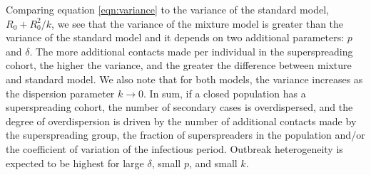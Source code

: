 \documentclass{imammb}
\numberwithin{equation}{section}
\newcommand{\comment}[1]{}
\begin{document}
Comparing equation \eqref{eqn:variance} to the variance of the standard model, $R_0+R_0^2/k$, we see that the variance of the mixture model is greater than the variance of the standard model and it depends on two additional parameters: $p$ and $\delta$. The more additional contacts made per individual in the superspreading cohort, the higher the variance, and the greater the difference between mixture and standard model. We also note that for both models, the variance increases as the dispersion parameter $k\rightarrow 0$. In sum, if a closed population has a superspreading cohort, the number of secondary cases is overdispersed, and the degree of overdispersion is driven by the number of additional contacts made by the superspreading group, the fraction of superspreaders in the population and/or the coefficient of variation of the infectious period. Outbreak heterogeneity is expected to be highest for large $\delta$, small $p$, and small $k$.  %


\comment{
\begin{align*}
P(5 \text{ secondary infections }) &= P( \text{ 5 secondary infections from infectious individual in superspreading cohort}) \\&\text{ or } P( \text{ 5 secondary infections from infectious individual in regular cohort })\\
&=P(\text{choosing regular infectious individ})P(5 \text{ infections conditional on regular infectious individ})\\ &\text{or } P(\text{superspreading})P(5 \text{infections conditional on being from superspreading cohort}), 
\end{align*}
or expressed mathematically as,
\begin{align*}
    P(I=5) &=(1-p) P(I=5|\text{regular}) +p P(I=5|\text{superspreading}) \\
     &=p P(T=5|\mathcal{V}=\beta^R) +(1-p) P(T=5|\mathcal{V}=\beta^A)\\
     &=p \frac{(\beta^R)^5}{5!} e^{-\beta^R} +(1-p)\frac{(\beta^A)^5}{5!} e^{-\beta^A}.
\end{align*}
}
\end{document}
